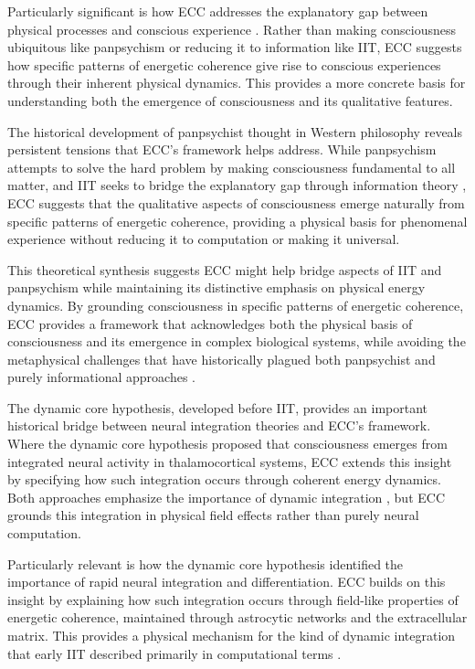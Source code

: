 \begin{refsection}
Particularly significant is how ECC addresses the explanatory gap between physical processes and conscious experience \cite{Koch2019}. Rather than making consciousness ubiquitous like panpsychism or reducing it to information like IIT, ECC suggests how specific patterns of energetic coherence give rise to conscious experiences through their inherent physical dynamics. This provides a more concrete basis for understanding both the emergence of consciousness and its qualitative features.

The historical development of panpsychist thought in Western philosophy \cite{Skrbina2017} reveals persistent tensions that ECC's framework helps address. While panpsychism attempts to solve the hard problem by making consciousness fundamental to all matter, and IIT seeks to bridge the explanatory gap through information theory \cite{Tononi2015}, ECC suggests that the qualitative aspects of consciousness emerge naturally from specific patterns of energetic coherence, providing a physical basis for phenomenal experience without reducing it to computation or making it universal.

This theoretical synthesis suggests ECC might help bridge aspects of IIT and panpsychism while maintaining its distinctive emphasis on physical energy dynamics. By grounding consciousness in specific patterns of energetic coherence, ECC provides a framework that acknowledges both the physical basis of consciousness and its emergence in complex biological systems, while avoiding the metaphysical challenges that have historically plagued both panpsychist and purely informational approaches \cite{Shani2015}.

The dynamic core hypothesis, developed before IIT, provides an important historical bridge between neural integration theories and ECC's framework. Where the dynamic core hypothesis proposed that consciousness emerges from integrated neural activity in thalamocortical systems, ECC extends this insight by specifying how such integration occurs through coherent energy dynamics. Both approaches emphasize the importance of dynamic integration \cite{Tononi2008}, but ECC grounds this integration in physical field effects rather than purely neural computation.

Particularly relevant is how the dynamic core hypothesis identified the importance of rapid neural integration and differentiation. ECC builds on this insight by explaining how such integration occurs through field-like properties of energetic coherence, maintained through astrocytic networks and the extracellular matrix. This provides a physical mechanism for the kind of dynamic integration that early IIT described primarily in computational terms \cite{Oizumi2014}.


\end{refsection}
